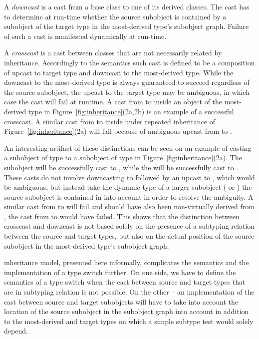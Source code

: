 A \emph{downcast} is a cast from a base class to one of its derived classes. The 
cast has to determine at run-time whether the source subobject is contained by a 
subobject of the target type in the most-derived type's subobject graph. Failure 
of such a cast is manifested dynamically at run-time.

A \emph{crosscast} is a cast between classes that are not necessarily related by 
inheritance. Accordingly to the \Cpp{} semantics such cast is defined to be a 
composition of upcast to target type and downcast to the most-derived type. 
While the downcast to the most-derived type is always guaranteed to succeed 
regardless of the source subobject, the upcast to the target type may be 
ambiguous, in which case the cast will fail at runtime. A cast from  to 
 inside an object of the most-derived type  in 
Figure~\ref{fig:inheritance}(2a,2b) is an example of a successful crosscast. A 
similar cast from  to  inside  under repeated  
inheritance of Figure~\ref{fig:inheritance}(2a) will fail because of ambiguous 
upcast from  to .

An interesting artifact of these distinctions can be seen on an example of 
casting a subobject of type  to a subobject of type  in 
Figure~\ref{fig:inheritance}(2a). The subobject  will be 
successfully cast to , while the  will be 
successfully cast to . These casts do not involve downcasting to 
 followed by an upcast to , which would be ambiguous, but 
instead take the dynamic type of a larger subobject ( or ) 
the source subobject is contained in into account in order to resolve the 
ambiguity. A similar cast from  to  will fail and should 
 have also been non-virtually derived from , the cast from 
 to  would have failed. This shows that the distinction 
between crosscast and downcast is not based solely on the presence of a 
subtyping relation between the source and target types, but also on the actual 
position of the source subobject in the most-derived type's subobject graph.

\Cpp{} inheritance model, presented here informally, complicates the semantics and 
the implementation of a type switch further. On one side, we have to define the 
semantics of a type switch when the cast between source and target types that 
are in subtyping relation is not possible. On the other -- an implementation of 
the cast between source and target subobjects will have to take into account the 
location of the source subobject in the subobject graph into account in addition 
to the most-derived and target types on which a simple subtype test would solely 
depend.

